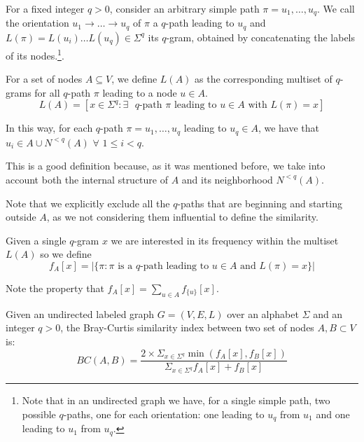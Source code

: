 For a fixed integer $q > 0$, consider an arbitrary simple path $\pi = u_{1}, \ldots, u_{q}$. We call the orientation $u_{1} \rightarrow \ldots \rightarrow u_{q}$ of $\pi$ a $q$-path leading to $u_{q}$ and $L(\pi) = L(u_{i}) \ldots L(u_{q}) \in \Sigma^{q}$ its $q$-gram, obtained by concatenating the labels of its nodes.\footnote{Note that in an undirected graph we have, for a single simple path, two possible $q$-paths, one for each orientation: one leading to $u_{q}$ from $u_{1}$ and one leading to $u_{1}$ from $u_{q}$.}.\medskip

For a set of nodes $A \subseteq V$, we define $L(A)$ as the corresponding multiset of $q$-grams for all $q$-path $\pi$ leading to a node $u \in A$. 
\begin{equation}
L(A) = [x \in \Sigma^{q} : \exists \text{ $q$-path } \pi \text{ leading to } u \in A \text{ with } L(\pi) = x]
\end{equation}

In this way, for each $q$-path $\pi = u_{1}, \ldots, u_{q}$ leading to $u_{q} \in A$, we have that $u_{i} \in A \cup N^{<q}(A)$ $\forall$ $1 \leq i < q$. \medskip

This is a good definition because, as it was mentioned before, we take into account both the internal structure of $A$ and its neighborhood $N^{<q}(A)$. 

Note that we explicitly exclude all the $q$-paths that are beginning and starting outside $A$, as we not considering them influential to define the similarity.\medskip

Given a single $q$-gram $x$ we are interested in its frequency within the multiset $L(A)$ so we define
\begin{equation}
f_{A}[x] = |\{ \pi : \pi \text{ is a $q$-path leading to } u \in A \text{ and } L(\pi) = x \}|
\end{equation}

Note the property that $f_{A}[x] = \sum_{u \in A}{f_{\{u\}}[x]}$.

\begin{definizione}
	Given an undirected labeled graph $G = (V,E,L)$ over an alphabet $\Sigma$ and an integer $q > 0$, the Bray-Curtis similarity index between two set of nodes $A, B \subset V$ is:
	\begin{equation}\label{bray-sub}
	BC(A,B) = \frac{ 2 \times \Sigma_{x \in \Sigma^{q}} \min(f_{A}[x], f_{B}[x]) }{ \Sigma_{x \in \Sigma^{q}} f_{A}[x] + f_{B}[x] }
	\end{equation}
\end{definizione}

